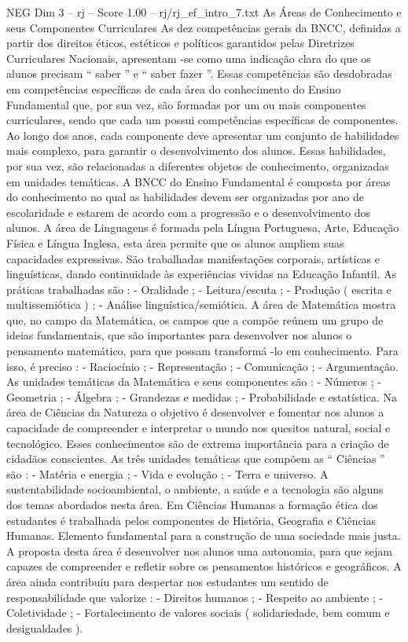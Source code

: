 \begin{textsample}{NEG Dim 3 – rj – Score 1.00 – rj/rj\_ef\_intro\_7.txt}  \label{ex:f3_neg_273}
As Áreas de Conhecimento e seus Componentes Curriculares As dez competências gerais da BNCC, definidas a partir dos direitos éticos, estéticos e políticos garantidos pelas Diretrizes Curriculares Nacionais, apresentam -se como uma indicação clara do que os alunos precisam “ saber ” e “ saber fazer ”.
Essas competências são desdobradas em competências específicas de cada área do conhecimento do Ensino Fundamental que, por sua vez, são formadas por um ou mais componentes curriculares, sendo que cada um possui competências específicas de componentes.
Ao longo dos anos, cada componente deve apresentar um conjunto de habilidades mais complexo, para garantir o desenvolvimento dos alunos.
Essas habilidades, por sua vez, são relacionadas a diferentes objetos de conhecimento, organizadas em unidades temáticas.
A BNCC do Ensino Fundamental é composta por áreas do conhecimento no qual as habilidades devem ser organizadas por ano de escolaridade e estarem de acordo com a progressão e o desenvolvimento dos alunos.
A área de Linguagens é formada pela Língua Portuguesa, Arte, Educação Física e Língua Inglesa, esta área permite que os alunos ampliem suas capacidades expressivas.
São trabalhadas manifestações corporais, artísticas e linguísticas, dando continuidade às experiências vividas na Educação Infantil.
As práticas trabalhadas são : - Oralidade ; - Leitura/escuta ; - Produção ( escrita e multissemiótica ) ; - Análise linguística/semiótica.
A área de Matemática mostra que, no campo da Matemática, os campos que a compõe reúnem um grupo de ideias fundamentais, que são importantes para desenvolver nos alunos o pensamento matemático, para que possam transformá -lo em conhecimento.
Para isso, é preciso : - Raciocínio ; - Representação ; - Comunicação ; - Argumentação.
As unidades temáticas da Matemática e seus componentes são : - Números ; - Geometria ; - Álgebra ; - Grandezas e medidas ; - Probabilidade e estatística.
Na área de Ciências da Natureza o objetivo é desenvolver e fomentar nos alunos a capacidade de compreender e interpretar o mundo nos quesitos natural, social e tecnológico.
Esses conhecimentos são de extrema importância para a criação de cidadãos conscientes.
As três unidades temáticas que compõem as “ Ciências ” são : - Matéria e energia ; - Vida e evolução ; - Terra e universo.
A sustentabilidade socioambiental, o ambiente, a saúde e a tecnologia são alguns dos temas abordados nesta área.
Em Ciências Humanas a formação ética dos estudantes é trabalhada pelos componentes de História, Geografia e Ciências Humanas.
Elemento fundamental para a construção de uma sociedade mais justa.
A proposta desta área é desenvolver nos alunos uma autonomia, para que sejam capazes de compreender e refletir sobre os pensamentos históricos e geográficos.
A área ainda contribuiu para despertar nos estudantes um sentido de responsabilidade que valorize : - Direitos humanos ; - Respeito ao ambiente ; - Coletividade ; - Fortalecimento de valores sociais ( solidariedade, bem comum e desigualdades ).

\end{textsample}
